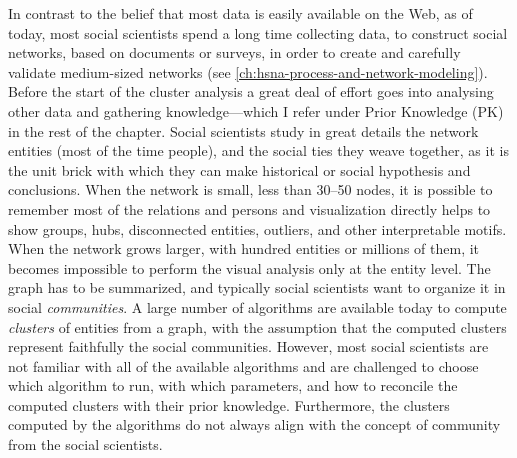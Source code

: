 In contrast to the belief that most data is easily available on the Web, as of today, most social scientists spend a long time collecting data, to construct social networks, based on documents or surveys, in order to create and carefully validate medium-sized networks (see \autoref{ch:hsna-process-and-network-modeling}).
Before the start of the cluster analysis a great deal of effort goes into analysing other data and gathering knowledge---which I refer under Prior Knowledge (PK) in the rest of the chapter.
Social scientists study in great details the network entities (most of the time people), and the social ties they weave together, as it is the unit brick with which they can make historical or social hypothesis and conclusions.
When the network is small, less than 30--50 nodes, it is possible to remember most of the relations and persons and visualization directly helps to show groups, hubs, disconnected entities, outliers, and other interpretable motifs.
When the network grows larger, with hundred entities or millions of them, it becomes impossible to perform the visual analysis only at the entity level.
The graph has to be summarized, and typically social scientists want to organize it in social \emph{communities}.  A large number of algorithms are available today to compute \emph{clusters} of entities from a graph, with the assumption that the computed clusters represent faithfully the social communities.
However, most social scientists are not familiar with all of the available algorithms and are challenged to choose which algorithm to run, with which parameters, and how to reconcile the computed clusters with their prior knowledge. Furthermore, the clusters computed by the algorithms do not always align with the concept of community from the social scientists.


